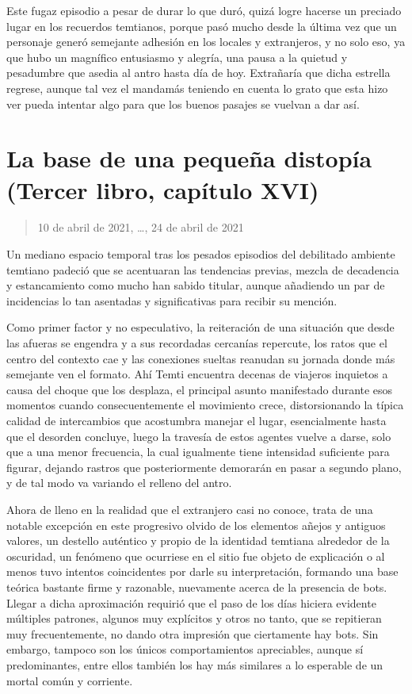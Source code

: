 \documentclass[
]{book}
\begin{document}
Este fugaz episodio a pesar de durar lo que duró, quizá logre hacerse un preciado lugar en los recuerdos temtianos, porque pasó mucho desde la última vez que un personaje generó semejante adhesión en los locales y extranjeros, y no solo eso, ya que hubo un magnífico entusiasmo y alegría, una pausa a la quietud y pesadumbre que asedia al antro hasta día de hoy. Extrañaría que dicha estrella regrese, aunque tal vez el mandamás teniendo en cuenta lo grato que esta hizo ver pueda intentar algo para que los buenos pasajes se vuelvan a dar así.

\hypertarget{la-base-de-una-pequeuxf1a-distopuxeda-tercer-libro-capuxedtulo-xvi}{%
\section{La base de una pequeña distopía (Tercer libro, capítulo XVI)}\label{la-base-de-una-pequeuxf1a-distopuxeda-tercer-libro-capuxedtulo-xvi}}

\begin{quote}
10 de abril de 2021, \ldots, 24 de abril de 2021
\end{quote}

Un mediano espacio temporal tras los pesados episodios del debilitado ambiente temtiano padeció que se acentuaran las tendencias previas, mezcla de decadencia y estancamiento como mucho han sabido titular, aunque añadiendo un par de incidencias lo tan asentadas y significativas para recibir su mención.

Como primer factor y no especulativo, la reiteración de una situación que desde las afueras se engendra y a sus recordadas cercanías repercute, los ratos que el centro del contexto cae y las conexiones sueltas reanudan su jornada donde más semejante ven el formato. Ahí Temti encuentra decenas de viajeros inquietos a causa del choque que los desplaza, el principal asunto manifestado durante esos momentos cuando consecuentemente el movimiento crece, distorsionando la típica calidad de intercambios que acostumbra manejar el lugar, esencialmente hasta que el desorden concluye, luego la travesía de estos agentes vuelve a darse, solo que a una menor frecuencia, la cual igualmente tiene intensidad suficiente para figurar, dejando rastros que posteriormente demorarán en pasar a segundo plano, y de tal modo va variando el relleno del antro.

Ahora de lleno en la realidad que el extranjero casi no conoce, trata de una notable excepción en este progresivo olvido de los elementos añejos y antiguos valores, un destello auténtico y propio de la identidad temtiana alrededor de la oscuridad, un fenómeno que ocurriese en el sitio fue objeto de explicación o al menos tuvo intentos coincidentes por darle su interpretación, formando una base teórica bastante firme y razonable, nuevamente acerca de la presencia de bots. Llegar a dicha aproximación requirió que el paso de los días hiciera evidente múltiples patrones, algunos muy explícitos y otros no tanto, que se repitieran muy frecuentemente, no dando otra impresión que ciertamente hay bots. Sin embargo, tampoco son los únicos comportamientos apreciables, aunque sí predominantes, entre ellos también los hay más similares a lo esperable de un mortal común y corriente.
\end{document}
